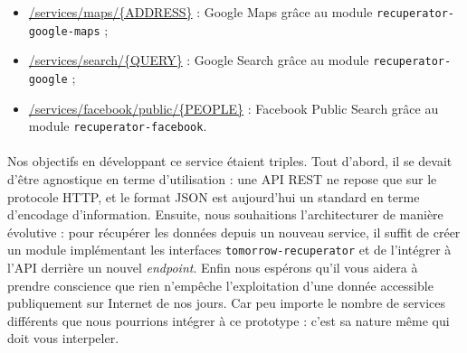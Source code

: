 \begin{itemize}
    \item \url{/services/maps/{ADDRESS}} : Google Maps grâce au module \lstinline{recuperator-google-maps} ;
    \item \url{/services/search/{QUERY}} : Google Search grâce au module \lstinline{recuperator-google} ;
    \item \url{/services/facebook/public/{PEOPLE}} : Facebook Public Search grâce au module \lstinline{recuperator-facebook}.
\end{itemize}

\paragraph{} Nos objectifs en développant ce service étaient triples. Tout d'abord, il se devait d'être agnostique en terme
d'utilisation : une API REST ne repose que sur le protocole HTTP, et le format JSON est aujourd'hui un standard en terme
d'encodage d'information. Ensuite, nous souhaitions l'architecturer de manière évolutive : pour récupérer les données
depuis un nouveau service, il suffit de créer un module implémentant les interfaces \lstinline{tomorrow-recuperator} et
de l'intégrer à l'API derrière un nouvel \emph{endpoint}. Enfin nous espérons qu'il vous aidera à prendre conscience que
rien n'empêche l'exploitation d'une donnée accessible publiquement sur Internet de nos jours. Car peu importe le nombre
de services différents que nous pourrions intégrer à ce prototype : c'est sa nature même qui doit vous interpeler.